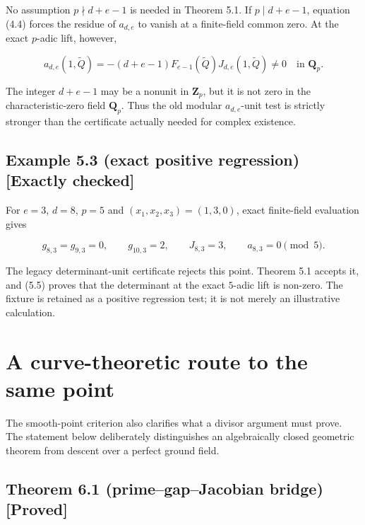 \documentclass[
]{article}
\begin{document}
No assumption \(p\nmid d+e-1\) is needed in Theorem 5.1. If
\(p\mid d+e-1\), equation (4.4) forces the residue of \(a_{d,e}\) to
vanish at a finite-field common zero. At the exact \(p\)-adic lift,
however,

\[
a_{d,e}(1,\widetilde Q)=
-(d+e-1)F_{e-1}(\widetilde Q)
J_{d,e}(1,\widetilde Q)\ne0
\quad\text{in }\mathbf Q_p.
\tag{5.5}
\]

The integer \(d+e-1\) may be a nonunit in \(\mathbf Z_p\), but it is not
zero in the characteristic-zero field \(\mathbf Q_p\). Thus the old
modular \(a_{d,e}\)-unit test is strictly stronger than the certificate
actually needed for complex existence.

\subsection*{Example 5.3 (exact positive regression) {[}Exactly
checked{]}}\label{example-5.3-exact-positive-regression-exactly-checked}

For \(e=3\), \(d=8\), \(p=5\) and \((x_1,x_2,x_3)=(1,3,0)\), exact
finite-field evaluation gives

\[
g_{8,3}=g_{9,3}=0,\qquad
g_{10,3}=2,\qquad J_{8,3}=3,\qquad a_{8,3}=0
\pmod5.
\]

The legacy determinant-unit certificate rejects this point. Theorem 5.1
accepts it, and (5.5) proves that the determinant at the exact
\(5\)-adic lift is non-zero. The fixture is retained as a positive
regression test; it is not merely an illustrative calculation.

\section{A curve-theoretic route to the same
point}\label{a-curve-theoretic-route-to-the-same-point}

The smooth-point criterion also clarifies what a divisor argument must
prove. The statement below deliberately distinguishes an algebraically
closed geometric theorem from descent over a perfect ground field.

\subsection*{Theorem 6.1 (prime--gap--Jacobian bridge)
{[}Proved{]}}\label{theorem-6.1-primegapjacobian-bridge-proved}
\end{document}
